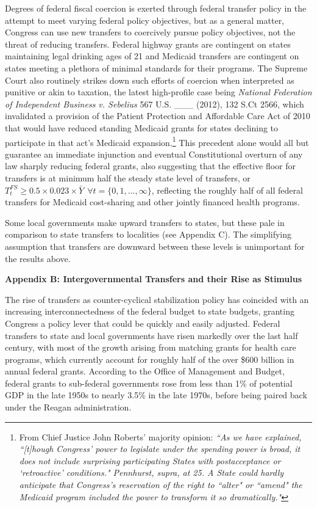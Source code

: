 \documentclass[12pt,letterpaper]{article}
\begin{document}
Degrees of federal fiscal coercion is exerted through federal transfer policy in the attempt to meet varying federal policy objectives, but as a general matter, Congress can use new transfers to coercively pursue policy objectives, not the threat of reducing transfers. Federal highway grants are contingent on states maintaining legal drinking ages of 21 and Medicaid transfers are contingent on states meeting a plethora of minimal standards for their programs. The Supreme Court also routinely strikes down such efforts of coercion when interpreted as punitive or akin to taxation, the latest high-profile case being \textit{National Federation of Independent Business v. Sebelius}  567 U.S. \_\_\_ (2012), 132 S.Ct 2566, which invalidated a provision of the Patient Protection and Affordable Care Act of 2010 that would have reduced standing Medicaid grants for states declining to participate in that act's Medicaid expansion.\footnote{From Chief Justice John Roberts' majority opinion: \textit{``As we have explained, ``[t]hough Congress' power to legislate under the spending power is broad, it does not include surprising participating States with postacceptance or `retroactive' conditions." Pennhurst, supra, at 25. A State could hardly anticipate that Congress's reservation of the right to ``alter" or ``amend" the Medicaid program included the power to transform it so dramatically."}} This precedent alone would all but guarantee an immediate injunction and eventual Constitutional overturn of any law sharply reducing federal grants, also suggesting that the effective floor for transfers is at minimum half the steady state level of transfers, or $ T^{FS}_t \geq 0.5 \times 0.023 \times \bar{Y} \ \ \forall t=\{0,1,..., \infty\}$, reflecting the roughly half of all federal transfers for Medicaid cost-sharing and other jointly financed health programs.

Some local governments make upward transfers to states, but these pale in comparison to state transfers to localities (see Appendix C). The simplifying assumption that transfers are downward between these levels is unimportant for the results above.


\pagebreak

\begin{center}
\textbf{Appendix B: Intergovernmental Transfers and their Rise as Stimulus}
\end{center}

The rise of transfers as counter-cyclical stabilization policy has coincided with an increasing interconnectedness of the federal budget to state budgets, granting Congress a policy lever that could be quickly and easily adjusted. Federal transfers to state and local governments have risen markedly over the last half century, with most of the growth arising from matching grants for health care programs, which currently account for roughly half of the over \$600 billion in annual federal grants. According to the Office of Management and Budget, federal grants to sub-federal governments rose from less than 1\% of potential GDP in the late 1950s to nearly 3.5\% in the late 1970s, before being paired back under the Reagan administration. 
\end{document}
